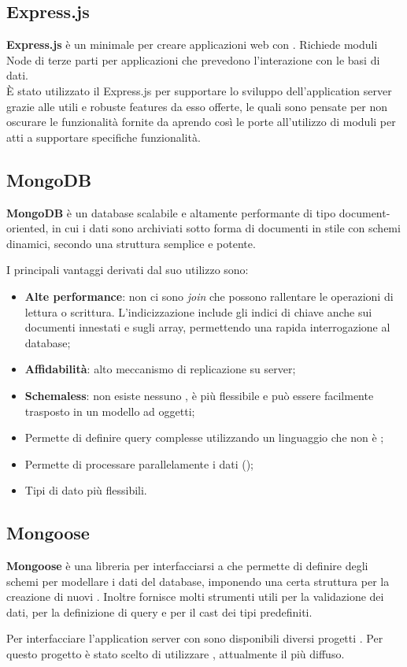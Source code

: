 \subsection{Express.js}
\textbf{Express.js} è un  minimale per creare applicazioni web con . Richiede moduli Node di terze parti per applicazioni che prevedono l’interazione con le basi di dati. \\
È stato utilizzato il  Express.js per supportare lo sviluppo dell'application server grazie alle utili e robuste features da esso offerte, le quali sono pensate per non oscurare le funzionalità fornite da  aprendo così le porte all'utilizzo di moduli per  atti a supportare specifiche funzionalità.

\subsection{MongoDB}
\textbf{MongoDB} è un database   scalabile e altamente performante di tipo document-oriented, in cui i dati sono archiviati sotto forma di documenti in stile  con schemi dinamici, secondo una struttura semplice e potente.

I principali vantaggi derivati dal suo utilizzo sono:
\begin{itemize}
	\item \textbf{Alte performance}: non ci sono \emph{join} che possono rallentare le operazioni di lettura o scrittura. L’indicizzazione include gli indici di chiave anche sui documenti innestati e sugli array, permettendo una rapida interrogazione al database;
	\item \textbf{Affidabilità}: alto meccanismo di replicazione su server;
	\item \textbf{Schemaless}: non esiste nessuno , è più flessibile e può essere facilmente trasposto in un modello ad oggetti;
	\item Permette di definire query complesse utilizzando un linguaggio che non è ;
	\item Permette di processare parallelamente i dati ();
	\item Tipi di dato più flessibili.
\end{itemize}

\subsection{Mongoose}
\textbf{Mongoose} è una libreria per interfacciarsi a  che permette di definire degli schemi per modellare i dati del database, imponendo una certa struttura per la creazione di nuovi . Inoltre fornisce molti strumenti utili per la validazione dei dati, per la definizione di query e per il cast dei tipi predefiniti.

Per interfacciare l'application server con  sono disponibili diversi progetti . Per questo progetto è stato scelto di utilizzare , attualmente il più diffuso.